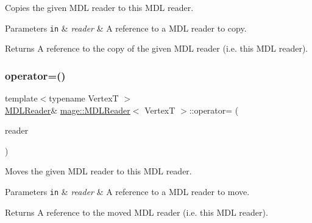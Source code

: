 Copies the given M\+DL reader to this M\+DL reader.


\begin{DoxyParams}[1]{Parameters}
\mbox{\tt in}  & {\em reader} & A reference to a M\+DL reader to copy. \\
\hline
\end{DoxyParams}
\begin{DoxyReturn}{Returns}
A reference to the copy of the given M\+DL reader (i.\+e. this M\+DL reader). 
\end{DoxyReturn}
\hypertarget{classmage_1_1_m_d_l_reader_a993c23d2e7f16f22a28e48ae9b7173b4}{}\label{classmage_1_1_m_d_l_reader_a993c23d2e7f16f22a28e48ae9b7173b4} 
\subsubsection{\texorpdfstring{operator=()}{operator=()}\hspace{0.1cm}{\footnotesize\ttfamily [2/2]}}
{\footnotesize\ttfamily template$<$typename VertexT $>$ \\
\hyperlink{classmage_1_1_m_d_l_reader}{M\+D\+L\+Reader}\& \hyperlink{classmage_1_1_m_d_l_reader}{mage\+::\+M\+D\+L\+Reader}$<$ VertexT $>$\+::operator= (\begin{DoxyParamCaption}\item[{\hyperlink{classmage_1_1_m_d_l_reader}{M\+D\+L\+Reader}$<$ VertexT $>$ \&\&}]{reader }\end{DoxyParamCaption})\hspace{0.3cm}{\ttfamily [delete]}}

Moves the given M\+DL reader to this M\+DL reader.


\begin{DoxyParams}[1]{Parameters}
\mbox{\tt in}  & {\em reader} & A reference to a M\+DL reader to move. \\
\hline
\end{DoxyParams}
\begin{DoxyReturn}{Returns}
A reference to the moved M\+DL reader (i.\+e. this M\+DL reader). 
\end{DoxyReturn}
\hypertarget{classmage_1_1_m_d_l_reader_a8b99fb3bdea5e9dae156b135c160c22d}{}\label{classmage_1_1_m_d_l_reader_a8b99fb3bdea5e9dae156b135c160c22d} 
